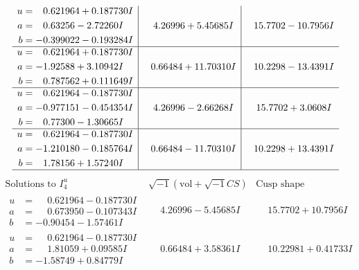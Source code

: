 \documentclass[1p]{elsarticle_modified}
\theoremstyle{definition}
\newcommand{\I}{\sqrt{-1}}
\begin{document}
$$\begin{array}{c|c|c}
\begin{aligned}
u &= \phantom{-}0.621964 + 0.187730 I \\
a &= \phantom{-}0.63256 - 2.72260 I \\
b &= -0.399022 - 0.193284 I\end{aligned}
 & \phantom{-}4.26996 + 5.45685 I & \phantom{-}15.7702 - 10.7956 I \\ \hline\begin{aligned}
u &= \phantom{-}0.621964 + 0.187730 I \\
a &= -1.92588 + 3.10942 I \\
b &= \phantom{-}0.787562 + 0.111649 I\end{aligned}
 & \phantom{-}0.66484 + 11.70310 I & \phantom{-}10.2298 - 13.4391 I \\ \hline\begin{aligned}
u &= \phantom{-}0.621964 - 0.187730 I \\
a &= -0.977151 - 0.454354 I \\
b &= \phantom{-}0.77300 - 1.30665 I\end{aligned}
 & \phantom{-}4.26996 - 2.66268 I & \phantom{-}15.7702 + 3.0608 I \\ \hline\begin{aligned}
u &= \phantom{-}0.621964 - 0.187730 I \\
a &= -1.210180 - 0.185764 I \\
b &= \phantom{-}1.78156 + 1.57240 I\end{aligned}
 & \phantom{-}0.66484 - 11.70310 I & \phantom{-}10.2298 + 13.4391 I\\
 \hline 
 \end{array}$$\newpage$$\begin{array}{c|c|c}  
\text{Solutions to }I^u_{4}& \I (\text{vol} + \sqrt{-1}CS) & \text{Cusp shape}\\
 \hline 
\begin{aligned}
u &= \phantom{-}0.621964 - 0.187730 I \\
a &= \phantom{-}0.673950 - 0.107343 I \\
b &= -0.90454 - 1.57461 I\end{aligned}
 & \phantom{-}4.26996 - 5.45685 I & \phantom{-}15.7702 + 10.7956 I \\ \hline\begin{aligned}
u &= \phantom{-}0.621964 - 0.187730 I \\
a &= \phantom{-}1.81059 + 0.09585 I \\
b &= -1.58749 + 0.84779 I\end{aligned}
 & \phantom{-}0.66484 + 3.58361 I & \phantom{-}10.22981 + 0.41733 I \\ \hline\begin{aligned}

\end{aligned}
\end{array}$$
\end{document}
